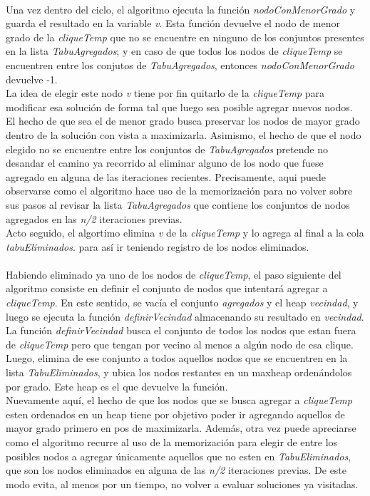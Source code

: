 \paragraph{}
Una vez dentro del ciclo, el algoritmo ejecuta la función \textit{nodoConMenorGrado} y guarda el resultado en la variable \textit{v}. Esta función devuelve el nodo de menor grado de la \textit{cliqueTemp} que no se encuentre en ninguno de los conjuntos presentes en la lista \textit{TabuAgregados}; y en caso de que todos los nodos de \textit{cliqueTemp} se encuentren entre los conjutos de \textit{TabuAgregados}, entonces \textit{nodoConMenorGrado} devuelve -1. \\
La idea de elegir este nodo \textit{v} tiene por fin quitarlo de la \textit{cliqueTemp} para modificar esa solución de forma tal que luego sea posible agregar nuevos nodos. El hecho de que sea el de menor grado busca preservar los nodos de mayor grado dentro de la solución con vista a maximizarla. Asimismo, el hecho de que el nodo elegido no se encuentre entre los conjuntos de \textit{TabuAgregados} pretende no desandar el camino ya recorrido al eliminar alguno de los nodo que fuese agregado en alguna de las iteraciones recientes. Precisamente, aqui puede observarse como el algoritmo hace uso de la memorización para no volver sobre sus pasos al revisar la lista \textit{TabuAgregados} que contiene los conjuntos de nodos agregados en las \textit{n/2} iteraciones previas. \\
Acto seguido, el algortimo elimina \textit{v} de la \textit{cliqueTemp} y lo agrega al final a la cola \textit{tabuEliminados}. para así ir teniendo registro de los nodos eliminados.

\paragraph{}
Habiendo eliminado ya uno de los nodos de \textit{cliqueTemp}, el paso siguiente del algoritmo consiste en definir el conjunto de nodos que intentará agregar a \textit{cliqueTemp}. En este sentido, se vacía el conjunto \textit{agregados} y el heap \textit{vecindad}, y luego se ejecuta la función \textit{definirVecindad} almacenando su resultado en \textit{vecindad}. La función \textit{definirVecindad} busca el conjunto de todos los nodos que estan fuera de \textit{cliqueTemp} pero que tengan por vecino al menos a algún nodo de esa clique. Luego, elimina de ese conjunto a todos aquellos nodos que se encuentren en la lista \textit{TabuEliminados}, y ubica los nodos restantes en un maxheap ordenándolos por grado. Este heap es el que devuelve la función. \\
Nuevamente aquí, el hecho de que los nodos que se busca agregar a \textit{cliqueTemp} esten ordenados en un heap tiene por objetivo poder ir agregando aquellos de mayor grado primero en pos de maximizarla. Además, otra vez puede apreciarse como el algoritmo recurre al uso de la memorización para elegir de entre los posibles nodos a agregar únicamente aquellos que no esten en \textit{TabuEliminados}, que son los nodos eliminados en alguna de las \textit{n/2} iteraciones previas. De este modo evita, al menos por un tiempo, no volver a evaluar soluciones ya visitadas.


